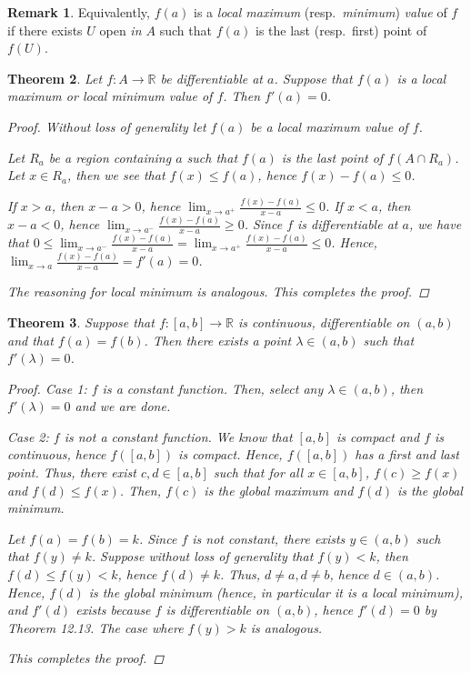 \documentclass[11pt]{article}
\newcommand{\bbR}{\mathbb{R}}
\renewcommand{\_}[1]{\underline{ #1 }}
\newtheorem{theorem}{Theorem}[section]
\theoremstyle{definition}
\newtheorem{remark}[theorem]{Remark}
\numberwithin{equation}{subsection}
\begin{document}
\begin{remark}
	Equivalently, $f(a)$ is a \emph{local maximum} (resp.\ \emph{minimum}) \emph{value} of $f$ if there exists $U$ open \emph{in $A$} such that $f(a)$ is the last (resp.\ first) point of $f(U)$.
	\end{remark}



\begin{theorem}
Let $f\colon A \to \bbR$ be differentiable at $a$. Suppose that $f(a)$ is a local maximum or local minimum value of $f$. Then $f'(a) = 0$.


\begin{proof}
Without loss of generality let $f(a)$ be a local maximum value of $f$.

Let $R_a$ be a region containing $a$ such that $f(a)$ is the last point of $f(A \cap R_a)$. Let $x \in R_a$, then we see that $f(x)\leq f(a)$, hence $f(x)-f(a)\leq 0$. 

If $x>a$, then $x-a>0$, hence $\lim_{x\to a^+} \frac{f(x)-f(a)}{x-a}\leq 0$. If $x<a$, then $x-a<0$, hence $\lim_{x\to a^-} \frac{f(x)-f(a)}{x-a}\geq 0$. Since $f$ is differentiable at $a$, we have that $0\leq \lim_{x\to a^-} \frac{f(x)-f(a)}{x-a}=\lim_{x\to a^+} \frac{f(x)-f(a)}{x-a} \leq 0$. Hence, $\lim_{x\to a} \frac{f(x)-f(a)}{x-a} = f'(a) = 0$.

The reasoning for local minimum is analogous. This completes the proof.

\renewcommand\qedsymbol{QED}
\end{proof}


\end{theorem}

\begin{theorem}\label{Rolle}
	Suppose that $f\colon [a, b] \to \bbR$ is continuous, differentiable on $(a, b)$ and that $f(a) = f(b)$. Then there exists a point $\lambda \in (a, b)$ such that $f'(\lambda) = 0$.
    
\begin{proof}
Case 1: $f$ is a constant function. Then, select any $\lambda \in (a,b)$, then $f'(\lambda) =0$ and we are done.

Case 2: $f$ is not a constant function. We know that $[a,b]$ is compact and $f$ is continuous, hence $f([a,b])$ is compact. Hence, $f([a,b])$ has a first and last point. Thus, there exist $c,d \in [a,b]$ such that for all $x\in [a,b]$, $f(c)\geq f(x)$ and $f(d)\leq f(x)$. Then, $f(c)$ is the global maximum and $f(d)$ is the global minimum.

Let $f(a)=f(b)=k$. Since $f$ is not constant, there exists $y \in (a,b)$ such that $f(y) \neq k$. Suppose without loss of generality that $f(y)<k$, then $f(d)\leq f(y)<k$, hence $f(d) \neq k$. Thus, $d \neq a, d\neq b$, hence $d \in (a,b)$. Hence, $f(d)$ is the global minimum (hence, in particular it is a local minimum), and $f'(d)$ exists because $f$ is differentiable on $(a,b)$, hence $f'(d)=0$ by Theorem 12.13. The case where $f(y)>k$ is analogous.

This completes the proof.

\renewcommand\qedsymbol{QED}
\end{proof}


\end{theorem}
\end{document}

